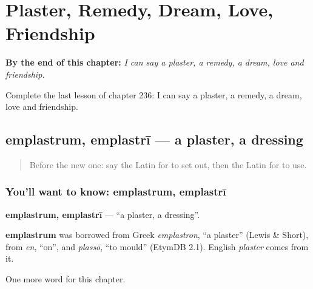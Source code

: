 
\chapter{Plaster, Remedy, Dream, Love, Friendship}
\label{ch:la-plaster-remedy-dream-love-friendship}

\begin{chapteropening}
\textbf{By the end of this chapter:} \emph{I can say a plaster, a remedy, a dream, love and friendship.}

Complete the last lesson of chapter 236: I can say a plaster, a remedy, a dream, love and friendship.
\end{chapteropening}

\section[emplastrum, emplastrī]{emplastrum, emplastrī — a plaster, a dressing}

\label{lesson:LA-C236-emplastrum}



\begin{quote}
Before the new one: say the Latin for to set out, then the Latin for to use.
\end{quote}

\subsection*{You'll want to know: emplastrum, emplastrī}
\textbf{emplastrum, emplastrī} — \textquotedblleft{}a plaster, a dressing\textquotedblright{}.

\begin{cousinweb}
\textbf{emplastrum} was borrowed from Greek \emph{emplastron}, \textquotedblleft{}a plaster\textquotedblright{} (Lewis \& Short), from \emph{en}, \textquotedblleft{}on\textquotedblright{}, and \emph{plassō}, \textquotedblleft{}to mould\textquotedblright{} (EtymDB 2.1). English \emph{plaster} comes from it.
\end{cousinweb}

\begin{grammarlens}[title={What you've built}]
One more word for this chapter.
\end{grammarlens}

